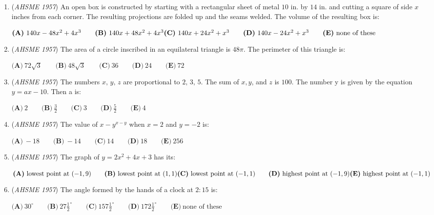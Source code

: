 \begin{enumerate}
	\item (\textit{AHSME 1957}) An open box is constructed by starting with a rectangular sheet of metal $10$ in. by $14$ in. 
and cutting a square of side $x$ inches from each corner. The resulting projections are folded up and the seams welded. 
The volume of the resulting box is: 


 $\textbf{(A)}\ 140x - 48x^2 + 4x^3 \qquad  \textbf{(B)}\ 140x + 48x^2 + 4x^3\qquad \\ \textbf{(C)}\ 140x+24x^2+x^3\qquad \textbf{(D)}\ 140x-24x^2+x^3\qquad \textbf{(E)}\ \text{none of these}$


	\item (\textit{AHSME 1957}) The area of a circle inscribed in an equilateral triangle is $48\pi$. The perimeter of this triangle is: 


 $\textbf{(A)}\ 72\sqrt{3} \qquad \textbf{(B)}\ 48\sqrt{3}\qquad \textbf{(C)}\ 36\qquad \textbf{(D)}\ 24\qquad \textbf{(E)}\ 72$


	\item (\textit{AHSME 1957}) The numbers $x,\,y,\,z$ are proportional to $2,\,3,\,5$. The sum of $x, y$, and $z$ is $100$. The number y is given by the equation $y = ax - 10$. Then a is: 


 $\textbf{(A)}\ 2 \qquad \textbf{(B)}\ \frac{3}{2}\qquad \textbf{(C)}\ 3\qquad \textbf{(D)}\ \frac{5}{2}\qquad \textbf{(E)}\ 4$


	\item (\textit{AHSME 1957}) The value of $x - y^{x - y}$ when $x = 2$ and $y = -2$ is: 


 $\textbf{(A)}\ -18 \qquad \textbf{(B)}\ -14\qquad \textbf{(C)}\ 14\qquad \textbf{(D)}\ 18\qquad \textbf{(E)}\ 256$


	\item (\textit{AHSME 1957}) The graph of $y = 2x^2 + 4x + 3$ has its: 


 $\textbf{(A)}\ \text{lowest point at } {(-1,9)}\qquad   \textbf{(B)}\ \text{lowest point at } {(1,1)}\qquad \\  \textbf{(C)}\ \text{lowest point at }{(-1,1)}\qquad \textbf{(D)}\ \text{highest point at }{(-1,9)}\qquad\\  \textbf{(E)}\ \text{highest point at }{(-1,1)}$


	\item (\textit{AHSME 1957}) The angle formed by the hands of a clock at $2:15$ is: 


 $\textbf{(A)}\ 30^\circ \qquad \textbf{(B)}\ 27\frac{1}{2}^\circ\qquad  \textbf{(C)}\ 157\frac{1}{2}^\circ\qquad  \textbf{(D)}\ 172\frac{1}{2}^\circ\qquad \textbf{(E)}\ \text{none of these}$



\end{enumerate}
